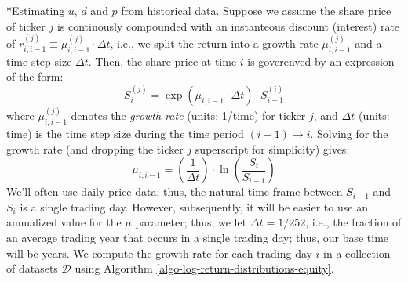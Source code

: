 \documentclass[11pt]{article}
\makeatletter
\theoremstyle{definition}
\renewcommand\subsubsection{\@startsection
	{subsubsection}{2}{0mm}
	{-0.05in}
	{-0.5\baselineskip}
	{\normalfont\normalsize\itshape\bfseries}}
\makeatother
\begin{document}
\subsubsection*{Estimating $u$, $d$ and $p$ from historical data.}
Suppose we assume the share price of ticker $j$ is continously compounded with an instanteous discount (interest) rate of 
$r^{(j)}_{i,i-1}\equiv\mu^{(j)}_{i,i-1}\cdot\Delta{t}$, i.e., we split the return into a growth rate $\mu^{(j)}_{i,i-1}$ and a time step size $\Delta{t}$.
Then, the share price at time $i$ is goverenved by an expression of the form:
\begin{equation}\label{eqn:share-price-growth-rate}
S^{(j)}_{i} = \exp\left(\mu_{i,i-1}\cdot\Delta{t}\right)\cdot{S^{(i)}_{i-1}}
\end{equation}
where $\mu^{(j)}_{i,i-1}$ denotes the \textit{growth rate} (units: 1/time) for ticker $j$, and $\Delta{t}$ (units: time) 
is the time step size during the time period $(i-1)\rightarrow{i}$.
Solving for the growth rate (and dropping the ticker $j$ superscript for simplicity) gives:
\begin{equation}
\mu_{i,i-1} = \left(\frac{1}{\Delta{t}}\right)\cdot\ln\left(\frac{S_{i}}{S_{i-1}}\right)
\end{equation}
We'll often use daily price data; thus, the natural time frame between $S_{i-1}$ and $S_{i}$ is a single trading day. 
However, subsequently, it will be easier to use an annualized value for the $\mu$ parameter; thus, we let $\Delta{t} = 1/252$, 
i.e., the fraction of an average trading year that occurs in a single trading day; thus, our base time will be years.
We compute the growth rate for each trading day $i$ in a collection of datasets $\mathcal{D}$ using Algorithm \ref{algo-log-return-distributions-equity}.
\end{document}
